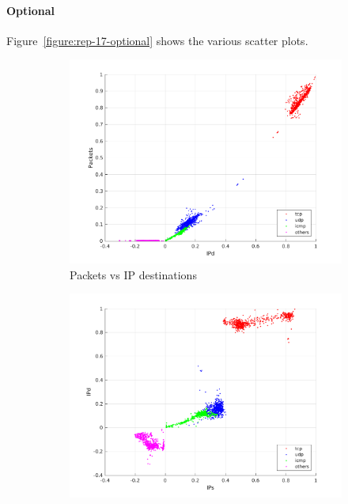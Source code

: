 \documentclass{article}
\begin{document}

\paragraph{Optional}

Figure~\ref{figure:rep-17-optional} shows the various scatter plots.

\begin{figure}[H]
    \begin{subfigure}{.5\textwidth}
        \centering
        \includegraphics[width=\textwidth]{../exercise-3/plots/rep_17_optional_IPdPackets.png}
        \caption{Packets vs IP destinations}
    \end{subfigure}
    \begin{subfigure}{.5\textwidth}
        \centering
        \includegraphics[width=\textwidth]{../exercise-3/plots/rep_17_optional_IPsIPd.png}

\end{subfigure}
\end{figure}
\end{document}
